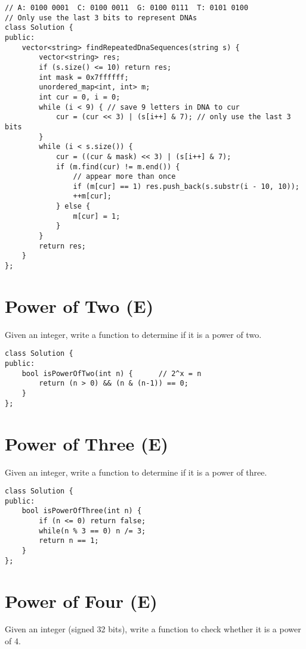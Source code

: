 \begin{lstlisting}
// A: 0100 0001  C: 0100 0011  G: 0100 0111  T: 0101 0100
// Only use the last 3 bits to represent DNAs 
class Solution {
public:
    vector<string> findRepeatedDnaSequences(string s) {
        vector<string> res;
        if (s.size() <= 10) return res;
        int mask = 0x7ffffff;
        unordered_map<int, int> m;
        int cur = 0, i = 0;
        while (i < 9) { // save 9 letters in DNA to cur
            cur = (cur << 3) | (s[i++] & 7); // only use the last 3 bits
        }
        while (i < s.size()) {
            cur = ((cur & mask) << 3) | (s[i++] & 7);
            if (m.find(cur) != m.end()) {
                // appear more than once
                if (m[cur] == 1) res.push_back(s.substr(i - 10, 10));
                ++m[cur]; 
            } else {
                m[cur] = 1;
            }
        }
        return res;
    }
};
\end{lstlisting}


\section{Power of Two (E)}
Given an integer, write a function to determine if it is a power of two. \\
 
\begin{lstlisting}
class Solution {
public:
    bool isPowerOfTwo(int n) {      // 2^x = n
        return (n > 0) && (n & (n-1)) == 0;
    }
};
\end{lstlisting}


\section{Power of Three (E)}
Given an integer, write a function to determine if it is a power of three. \\
 
\begin{lstlisting}
class Solution {
public:
    bool isPowerOfThree(int n) {
        if (n <= 0) return false;
        while(n % 3 == 0) n /= 3;
        return n == 1;
    }
};
\end{lstlisting}


\section{Power of Four (E)}
Given an integer (signed 32 bits), write a function to check whether it is a power of 4. \\

